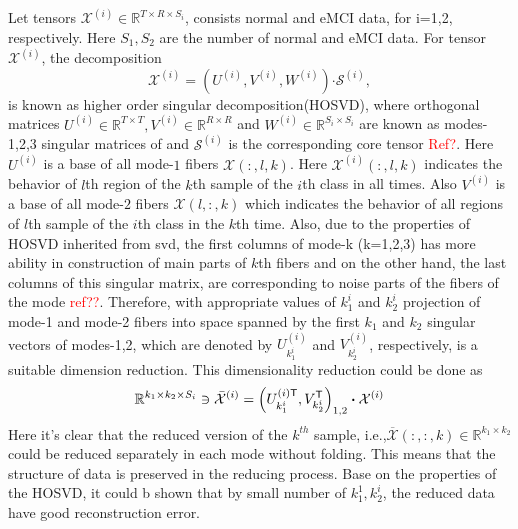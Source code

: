 \documentclass[journal]{IEEEtran}
\begin{document}
	Let tensors $\mathcal{X}^{(i)}\in \mathbb{R}^{T\times R \times S_i}$, consists normal and eMCI data, for i=1,2, respectively.  Here $S_1,S_2$ are the number of normal and eMCI data.
	For tensor $\mathcal{X}^{(i)}$, the decomposition
	\begin{equation}
	\label{ho}
	\mathcal{X}^{(i)} = 
	\left(  
	U^{(i)},V^{(i)},W^{(i)}
	\right)\boldsymbol{\cdot} \mathcal{S}^{(i)},
	\end{equation}
	is known as higher order singular decomposition(HOSVD),
	where orthogonal matrices $U^{(i)}\in \mathbb{R}^{T\times T}, V^{(i)}\in \mathbb{R}^{R\times R} $ and $W^{(i)}\in \mathbb{R}^{S_i\times S_i}$ are known as modes-1,2,3 singular matrices of 
	and $\mathcal{S}^{(i)}$ is the corresponding core tensor \textcolor{red}{Ref?}. Here $U^{(i)}$ is a base of all mode-$ 1 $ fibers $\mathcal{X}(:,l,k)$. Here  $\mathcal{X}^{(i)}(:,l,k)$ indicates the behavior of $l$th region of the $k$th sample of the $i$th class in all times. Also  $V^{(i)}$ is a base of all mode-$ 2 $ fibers $\mathcal{X}(l,:,k)$ which indicates the behavior of all regions of  $l$th  sample of the $i$th class in  the $k$th time.
	Also, due to the properties of HOSVD inherited from svd, the first columns of mode-k (k=1,2,3) has more ability in construction of main parts of $k$th fibers and on the other hand, the last columns of  this singular matrix, are corresponding to noise parts of the fibers of the mode \textcolor{red}{ref??}. Therefore, with appropriate values of $k^i_1$ and $k^i_2$ projection of mode-1 and mode-2 fibers into space spanned by  the first $k_1$ and $k_2$ singular vectors of modes-1,2, which  are denoted by  $U^{(i)}_{k^i_1}$ and $V_{k^i_2}^{(i)}$, respectively,
	is a suitable  dimension reduction. This dimensionality reduction could be done as
	\begin{align}
	\label{m1}
	\mathbb{R}^{k_1 \times k_2 \times S_i} \ni  \bar{{\mathcal{X}}}^{(i)} = \left( 
	U^{(i) {\sf {T}}}_{k^i_1}, V_{k^i_2}^{\sf {T}}
	\right)_{1,2}\boldsymbol{\cdot} \mathcal{X}^{(i)}
	\end{align}
	Here it's clear that the reduced version of the $k^{th}$ sample, i.e.,$\overline{\mathcal{X}}(:,:,k)\in \mathbb{R}^{k_1\times k_2}$ could be reduced separately  in each mode without folding. This means that the structure of data is preserved in the reducing process.
	Base on the properties of the  HOSVD, it could b shown that by small number of $k_1^1, k_2^i$, the reduced data have good reconstruction error. 
	
\end{document}
